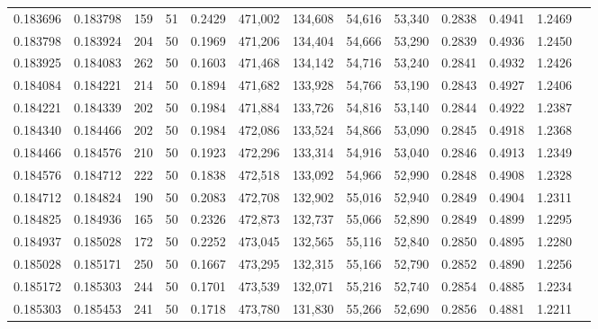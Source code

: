 \begin{tabular}{rrrrrrrrrrrrr}
0.183696 & 0.183798 &   159 &  51 &                                     0.2429 & 471,002 & 134,608 &  54,616 &  53,340 & 0.2838 & 0.4941 & 1.2469 \\
0.183798 & 0.183924 &   204 &  50 &                                     0.1969 & 471,206 & 134,404 &  54,666 &  53,290 & 0.2839 & 0.4936 & 1.2450 \\
0.183925 & 0.184083 &   262 &  50 &                                     0.1603 & 471,468 & 134,142 &  54,716 &  53,240 & 0.2841 & 0.4932 & 1.2426 \\
0.184084 & 0.184221 &   214 &  50 &                                     0.1894 & 471,682 & 133,928 &  54,766 &  53,190 & 0.2843 & 0.4927 & 1.2406 \\
0.184221 & 0.184339 &   202 &  50 &                                     0.1984 & 471,884 & 133,726 &  54,816 &  53,140 & 0.2844 & 0.4922 & 1.2387 \\
0.184340 & 0.184466 &   202 &  50 &                                     0.1984 & 472,086 & 133,524 &  54,866 &  53,090 & 0.2845 & 0.4918 & 1.2368 \\
0.184466 & 0.184576 &   210 &  50 &                                     0.1923 & 472,296 & 133,314 &  54,916 &  53,040 & 0.2846 & 0.4913 & 1.2349 \\
0.184576 & 0.184712 &   222 &  50 &                                     0.1838 & 472,518 & 133,092 &  54,966 &  52,990 & 0.2848 & 0.4908 & 1.2328 \\
0.184712 & 0.184824 &   190 &  50 &                                     0.2083 & 472,708 & 132,902 &  55,016 &  52,940 & 0.2849 & 0.4904 & 1.2311 \\
0.184825 & 0.184936 &   165 &  50 &                                     0.2326 & 472,873 & 132,737 &  55,066 &  52,890 & 0.2849 & 0.4899 & 1.2295 \\
0.184937 & 0.185028 &   172 &  50 &                                     0.2252 & 473,045 & 132,565 &  55,116 &  52,840 & 0.2850 & 0.4895 & 1.2280 \\
0.185028 & 0.185171 &   250 &  50 &                                     0.1667 & 473,295 & 132,315 &  55,166 &  52,790 & 0.2852 & 0.4890 & 1.2256 \\
0.185172 & 0.185303 &   244 &  50 &                                     0.1701 & 473,539 & 132,071 &  55,216 &  52,740 & 0.2854 & 0.4885 & 1.2234 \\
0.185303 & 0.185453 &   241 &  50 &                                     0.1718 & 473,780 & 131,830 &  55,266 &  52,690 & 0.2856 & 0.4881 & 1.2211 \\

\end{tabular}
